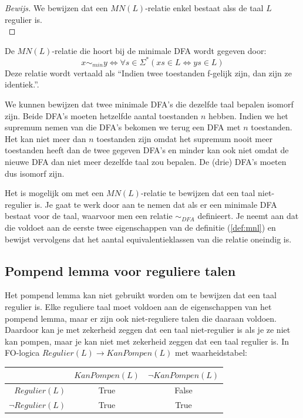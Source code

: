 \documentclass[a4paper]{article}
\newenvironment{bewijs}[1]%
  {\begin{mdframed}[topline=true,
    rightline=true,
    leftline=true,
    bottomline=true]\begin{proof}[Bewijs]#1\\[.2cm]\normalfont}%
  {\end{proof}\end{mdframed}}
\begin{document}
\begin{bewijs}{We bewijzen dat een $MN(L)$-relatie enkel bestaat alss de taal $L$ regulier is.}
  
\end{bewijs}


De $MN(L)$-relatie die hoort bij de minimale DFA wordt gegeven door:
\begin{equation*}
  x \sim_{min} y \Longleftrightarrow \forall s \in \Sigma^* (xs \in L \Leftrightarrow ys \in L)
\end{equation*}
Deze relatie wordt vertaald als ``Indien twee toestanden f-gelijk zijn, dan zijn ze identiek.''.

We kunnen bewijzen dat twee minimale DFA's die dezelfde taal bepalen isomorf zijn. Beide DFA's moeten hetzelfde aantal toestanden $n$ hebben. Indien we het supremum nemen van die DFA's bekomen we terug een DFA met $n$ toestanden. Het kan niet meer dan $n$ toestanden zijn omdat het supremum nooit meer toestanden heeft dan de twee gegeven DFA's en minder kan ook niet omdat de nieuwe DFA dan niet meer dezelfde taal zou bepalen. De (drie) DFA's moeten dus isomorf zijn.

Het is mogelijk om met een $MN(L)$-relatie te bewijzen dat een taal niet-regulier is. Je gaat te werk door aan te nemen dat als er een minimale DFA bestaat voor de taal, waarvoor men een relatie $\sim_{DFA}$ definieert. Je neemt aan dat die voldoet aan de eerste twee eigenschappen van de definitie (\ref{def:mnl}) en bewijst vervolgens dat het aantal equivalentieklassen van die relatie oneindig is.


\subsection{Pompend lemma voor reguliere talen}

Het pompend lemma kan niet gebruikt worden om te bewijzen dat een taal regulier is. Elke reguliere taal moet voldoen aan de eigenschappen van het pompend lemma, maar er zijn ook niet-reguliere talen die daaraan voldoen. Daardoor kan je met zekerheid zeggen dat een taal niet-regulier is als je ze niet kan pompen, maar je kan niet met zekerheid zeggen dat een taal regulier is. In FO-logica $Regulier(L) \rightarrow KanPompen(L)$ met waarheidstabel:
\begin{center}
\begin{tabular}{r|c|c}
                     & $KanPompen(L)$ & $\neg KanPompen(L)$ \\ \hline
  $Regulier(L)$      & True           & False               \\ \hline
  $\neg Regulier(L)$ & True           & True
\end{tabular}
\end{center}
\end{document}
